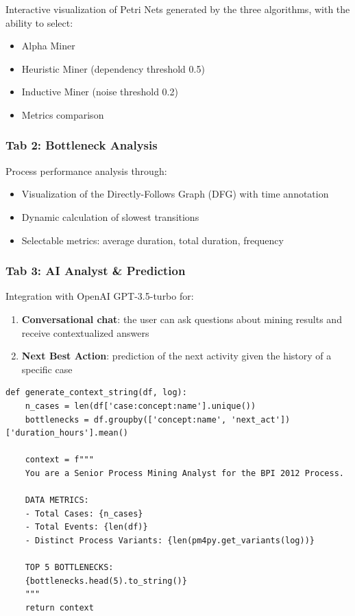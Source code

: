 \documentclass[a4paper,twoside,12pt]{article}
\begin{document}
Interactive visualization of Petri Nets generated by the three algorithms, with the ability to select:
\begin{itemize}
    \item Alpha Miner
    \item Heuristic Miner (dependency threshold 0.5)
    \item Inductive Miner (noise threshold 0.2)
    \item Metrics comparison
\end{itemize}

\subsubsection{Tab 2: Bottleneck Analysis}

Process performance analysis through:
\begin{itemize}
    \item Visualization of the Directly-Follows Graph (DFG) with time annotation
    \item Dynamic calculation of slowest transitions
    \item Selectable metrics: average duration, total duration, frequency
\end{itemize}

\subsubsection{Tab 3: AI Analyst \& Prediction}

Integration with OpenAI GPT-3.5-turbo for:

\begin{enumerate}
    \item \textbf{Conversational chat}: the user can ask questions about mining results and receive contextualized answers
    
    \item \textbf{Next Best Action}: prediction of the next activity given the history of a specific case
\end{enumerate}

\begin{lstlisting}[caption={Context generation for chatbot}]
def generate_context_string(df, log):
    n_cases = len(df['case:concept:name'].unique())
    bottlenecks = df.groupby(['concept:name', 'next_act'])['duration_hours'].mean()
    
    context = f"""
    You are a Senior Process Mining Analyst for the BPI 2012 Process.
    
    DATA METRICS:
    - Total Cases: {n_cases}
    - Total Events: {len(df)}
    - Distinct Process Variants: {len(pm4py.get_variants(log))}
    
    TOP 5 BOTTLENECKS:
    {bottlenecks.head(5).to_string()}
    """
    return context
\end{lstlisting}
\end{document}
